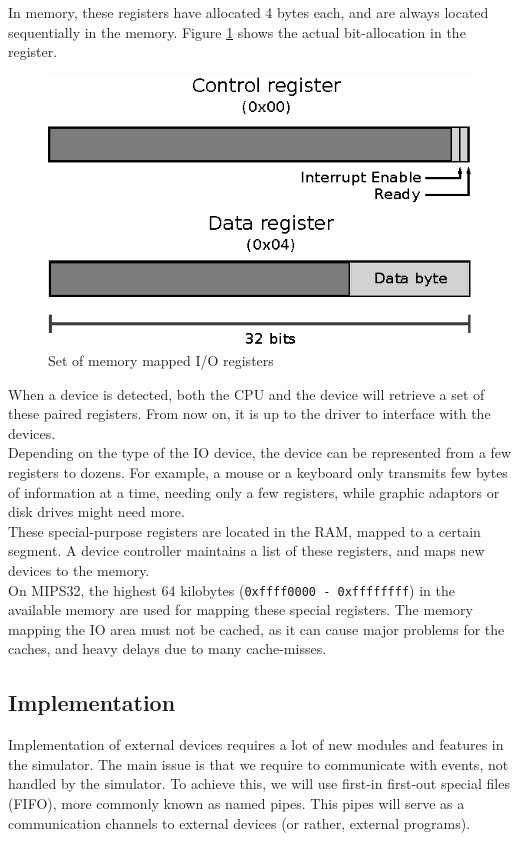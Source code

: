 In memory, these registers have allocated 4 bytes each, and are always located
sequentially in the memory. Figure \ref{fig:io_registers} shows the actual bit-allocation in the register.
\begin{figure}[H]
	\centering
	\includegraphics[scale=1]{io/io_registers.eps}
	\caption{Set of memory mapped I/O registers}
	\label{fig:io_registers}
\end{figure}

When a device is detected, both the CPU and the device will retrieve a set of
these paired registers. From now on, it is up to the driver to interface with
the devices.\\
Depending on the type of the IO device, the device can be represented from a
few registers to dozens. For example, a mouse or a keyboard only transmits few
bytes of information at a time, needing only a few registers, while graphic
adaptors or disk drives might need more\cite{cs_uwm:memory_mapped_io}.\\
These special-purpose registers are located in the RAM, mapped to a certain
segment. A device controller maintains a list of these registers, and maps new
devices to the memory.\cite{britton:mips}\\
On MIPS32, the highest 64 kilobytes (\texttt{0xffff0000 - 0xffffffff}) in the
available memory are used for mapping these special registers\cite{cs_uwm:memory_mapped_io}.
The memory mapping the IO area must not be cached, as it can cause major problems
for the caches, and heavy delays due to many cache-misses\cite{see_mips_run}.



\subsection{Implementation}
Implementation of external devices requires a lot of new modules and features
in the simulator. The main issue is that we require to communicate with
events, not handled by the simulator. To achieve this, we will use first-in
first-out special files (FIFO), more commonly known as named pipes. This pipes
will serve as a communication channels to external devices (or rather, external
programs).

